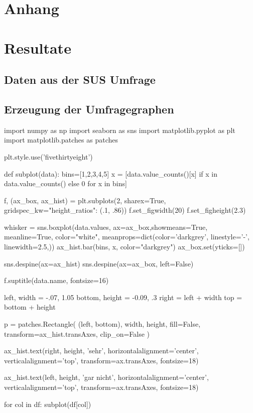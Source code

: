 \section{Anhang}

\section*{Resultate}

\subsection*{Daten aus der SUS Umfrage}



\subsection*{Erzeugung der Umfragegraphen}

\begin{python}
import numpy as np
import seaborn as sns
import matplotlib.pyplot as plt
import matplotlib.patches as patches


plt.style.use('fivethirtyeight')

def subplot(data):
    bins=[1,2,3,4,5]
    x = [data.value_counts()[x] if x in data.value_counts() else 0 for x in bins]

    f, (ax_box, ax_hist) = plt.subplots(2, sharex=True, gridspec_kw={"height_ratios": (.1, .86)})
    f.set_figwidth(20)
    f.set_figheight(2.3)

    whisker = sns.boxplot(data.values,
                          ax=ax_box,showmeans=True,
                          meanline=True, color="white",
                          meanprops=dict(color='darkgrey', linestyle='-', linewidth=2.5,))
    ax_hist.bar(bins, x, color="darkgrey")
    ax_box.set(yticks=[])

    sns.despine(ax=ax_hist)
    sns.despine(ax=ax_box, left=False)

    f.suptitle(data.name, fontsize=16)

    left, width = -.07, 1.05
    bottom, height = -0.09, .3
    right = left + width
    top = bottom + height

    p = patches.Rectangle(
    (left, bottom), width, height,
    fill=False, transform=ax_hist.transAxes, clip_on=False
    )

    ax_hist.text(right, height, 'sehr',
        horizontalalignment='center',
        verticalalignment='top',
        transform=ax.transAxes,
        fontsize=18)

    ax_hist.text(left, height, 'gar nicht',
        horizontalalignment='center',
        verticalalignment='top',
        transform=ax.transAxes,
        fontsize=18)


for col in df:
    subplot(df[col])
\end{python}

